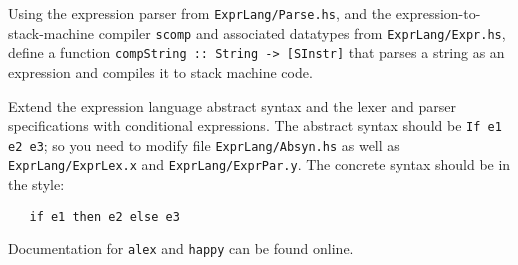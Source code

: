 \documentclass[a4paper]{article}
\begin{document}
\begin{exercise}\label{exer-expr-parse+scomp}
  Using the expression parser from \texttt{ExprLang/Parse.hs}, and the
  expression-to-stack-machine compiler \texttt{scomp} and associated
  datatypes from \texttt{ExprLang/Expr.hs}, define a function
  \texttt{compString ::\ String -> [SInstr]} that parses a string as
  an expression and compiles it to stack machine code.
\end{exercise}


\begin{exercise}\label{exer-expr-conditional}
  Extend the expression language abstract syntax and the lexer and
  parser specifications with conditional expressions.  The abstract
  syntax should be \texttt{If e1 e2 e3}; so you need to modify file
  \texttt{ExprLang/Absyn.hs} as well as \texttt{ExprLang/ExprLex.x} and
  \texttt{ExprLang/ExprPar.y}.  The concrete syntax should be in the
  style:

{\codesetup\begin{verbatim}
   if e1 then e2 else e3
\end{verbatim}}

\noindent 
Documentation for \texttt{alex} and \texttt{happy} can be found online.
\end{exercise}


%
%
%
%
\end{document}
